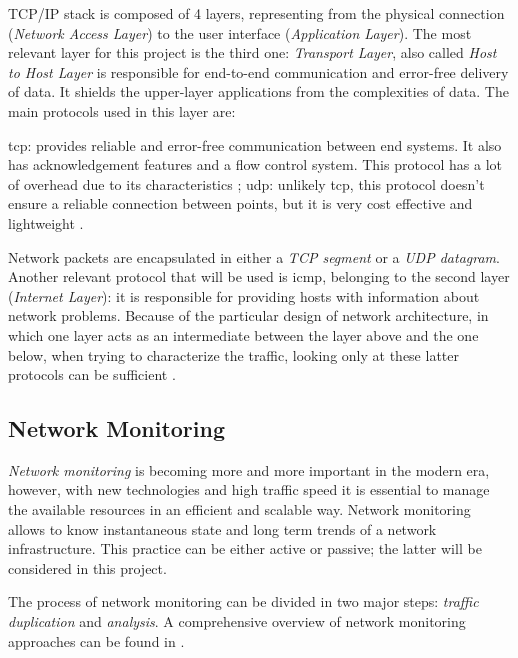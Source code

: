 \noindent TCP/IP stack is composed of 4 layers, representing from the physical connection (\textit{Network Access Layer}) to the user interface (\textit{Application Layer}). The most relevant layer for this project is the third one: \textit{Transport Layer}, also called \textit{Host to Host Layer} is responsible for end-to-end communication and error-free delivery of data. It shields the upper-layer applications from the complexities of data. The main protocols used in this layer are:

\begin{itemize}
    \itemAR \gls{tcp}: provides reliable and error-free communication between end systems. It also has acknowledgement features and a flow control system. This protocol has a lot of overhead due to its characteristics \cite{Kurose2012};
    \itemAR \gls{udp}: unlikely \gls{tcp}, this protocol doesn't ensure a reliable connection between points, but it is very cost effective and lightweight \cite{Kurose2012}.
\end{itemize}
Network packets are encapsulated in either a \textit{TCP segment} or a \textit{UDP datagram}. Another relevant protocol that will be used is \gls{icmp}, belonging to the second layer (\textit{Internet Layer}): it is responsible for providing hosts with information about network problems. Because of the particular design of network architecture, in which one layer acts as an intermediate between the layer above and the one below, when trying to characterize the traffic, looking only at these latter protocols can be sufficient \cite{Iglesias2015}.


\subsection{Network Monitoring}
\label{subsec:network-monitoring}

\textit{Network monitoring} is becoming more and more important in the modern era, however, with new technologies and high traffic speed it is essential to manage the available resources in an efficient and scalable way. Network monitoring allows to know instantaneous state and long term trends of a network infrastructure. This practice can be either active or passive; the latter will be considered in this project.
\par The process of network monitoring can be divided in two major steps: \textit{traffic duplication} and \textit{analysis}. A comprehensive overview of network monitoring approaches can be found in \cite{Svoboda2015}.

